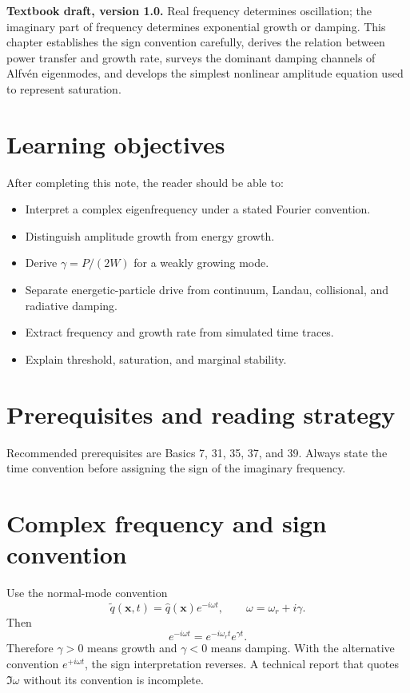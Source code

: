 \documentclass[11pt]{article}
\begin{document}

\begin{overviewbox}
\textbf{Textbook draft, version 1.0.} Real frequency determines oscillation; the imaginary part of frequency determines exponential growth or damping. This chapter establishes the sign convention carefully, derives the relation between power transfer and growth rate, surveys the dominant damping channels of Alfv\'en eigenmodes, and develops the simplest nonlinear amplitude equation used to represent saturation.
\end{overviewbox}

\ProjectTOC

\section{Learning objectives}
After completing this note, the reader should be able to:
\begin{itemize}[leftmargin=1.6em]
\item Interpret a complex eigenfrequency under a stated Fourier convention.
\item Distinguish amplitude growth from energy growth.
\item Derive $\gamma=P/(2W)$ for a weakly growing mode.
\item Separate energetic-particle drive from continuum, Landau, collisional, and radiative damping.
\item Extract frequency and growth rate from simulated time traces.
\item Explain threshold, saturation, and marginal stability.
\end{itemize}

\section{Prerequisites and reading strategy}
Recommended prerequisites are Basics 7, 31, 35, 37, and 39. Always state the time convention before assigning the sign of the imaginary frequency.

\section{Complex frequency and sign convention}
Use the normal-mode convention
\begin{equation}
\widetilde q(\mathbf x,t)=\widehat q(\mathbf x)e^{-i\omega t},
\qquad \omega=\omega_r+i\gamma.
\end{equation}
Then
\begin{equation}
e^{-i\omega t}=e^{-i\omega_r t}e^{\gamma t}.
\end{equation}
Therefore $\gamma>0$ means growth and $\gamma<0$ means damping. With the alternative convention $e^{+i\omega t}$, the sign interpretation reverses. A technical report that quotes $\Im\omega$ without its convention is incomplete.
\end{document}
